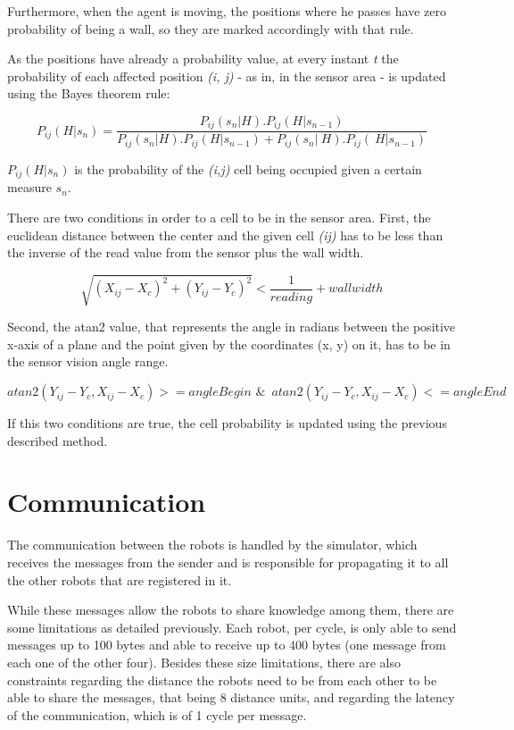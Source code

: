 \documentclass[oribibl]{llncs}
\begin{document}
Furthermore, when the agent is moving, the positions where he passes have zero probability of being a wall, so they are marked accordingly with that rule. 

As the positions have already a probability value, at every instant \emph{t} the probability of each affected position \emph{(i, j)} - as in, in the sensor area - is updated using the Bayes theorem rule:

 \begin{equation}
     P_{ij}(H|s_n) =   \dfrac{P_{ij}(s_n|H). P_{ij}(H|s_{n-1})}{P_{ij}(s_n|H).P_{ij}(H|s_{n-1})+ P_{ij}(s_n|~H).P_{ij}(~H|s_{n-1})}
\end{equation}

 $P_{ij}(H|s_n)$ is the probability of the \emph{(i,j)} cell being occupied given a certain measure $s_n$.

There are two conditions in order to a cell to be in the sensor area. First, the euclidean distance between the center and the given cell \emph{(ij)} has to be less than the inverse of the read value from the sensor plus the wall width. 

 \begin{equation}
    \sqrt{(X_{ij}-X_c)^2 + (Y_{ij}-Y_c)^2} < \dfrac{1}{reading} + wall width
\end{equation}

Second, the atan2 value, that represents the angle in radians between the positive x-axis of a plane and the point given by the coordinates (x, y) on it, has to be in the sensor vision angle range.

 \begin{equation}
    atan2(Y_{ij}-Y_c, X_{ij} - X_c) >= angleBegin \,\,\&\,\,\, atan2(Y_{ij}-Y_c, X_{ij} - X_c) <= angleEnd 
\end{equation}

If this two conditions are true, the cell probability is updated using the previous described method.

\section{Communication}
\label{communication}

The communication between the robots is handled by the simulator, which receives the messages from the sender and is responsible for propagating it to all the other robots that are registered in it. 

While these messages allow the robots to share knowledge among them, there are some limitations as detailed previously. Each robot, per cycle, is only able to send messages up to 100 bytes and able to receive up to 400 bytes (one message from each one of the other four). Besides these size limitations, there are also constraints regarding the distance the robots need to be from each other to be able to share the messages, that being 8 distance units, and regarding the latency of the communication, which is of 1 cycle per message.
\end{document}
